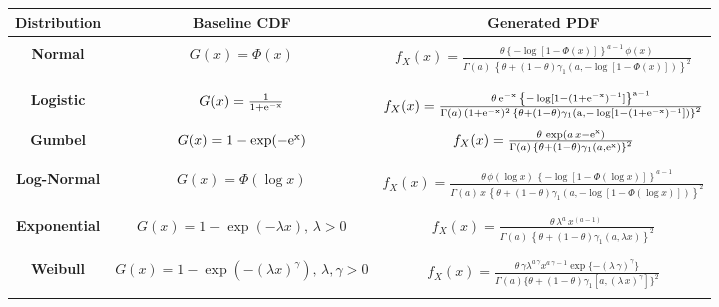 \documentclass[12pt,a4paper]{article} %
\begin{document}
\begin{landscape}
\begin{table}[htbp]\label{tabspecial1}
\centering
\begin{tabular}{c|c|c}
\hline
\textbf{Distribution} & \textbf{Baseline CDF} & \textbf{Generated PDF}  \\
\hline
{} & {} & {} \\
\textbf{Normal} &  $G(x)=\Phi(x)$ & $f_{X}(x)=\frac{\theta  \left\{ -\log[1-\Phi(x)] \right\}^{a-1}\, \phi(x)}{\Gamma(a)\,\left\{\theta+(1-\theta)\gamma_1\left( a, -\log \left[1-\Phi(x)\right]\right)\right\}^{2}}$ \\
{} & {} & {} \\
\hline
{} & {} & {} \\
\textbf{Logistic} &  $G(x)=\frac{1}{1+\rm{e}^{-x}}$ & $f_{X}(x)=\frac{\theta\,\rm{e}^{-x}\, \left\{ -\log[1-(1+\rm{e}^{-x})^{-1}] \right\}^{a-1}}{\Gamma(a)\,(1+\rm{e}^{-x})^{2}\,\left\{\theta+(1-\theta)\gamma_1\left( a, -\log \left[1-(1+\rm{e}^{-x})^{-1}\right]\right)\right\}^{2}}$\\
{} & {} & {} \\
\hline
\textbf{Gumbel} &  $G(x)=1-\exp(-\rm{e}^x)$ & $f_{X}(x)=\frac{\theta \, \exp(a \,x-  \rm{e}^x)}{\Gamma(a)\,\left\{\theta+(1-\theta)\gamma_1\left(a, \rm{e}^{x}\right)\right\}^{2}}$ \\
{} & {} & {} \\
\hline
{} & {} & {} \\
\textbf{Log-Normal} &  $G(x)=\Phi(\log x)$ & $f_{X}(x)=\frac{\theta\,\phi(\log x)\,  \left\{ -\log[1-\Phi(\log x)] \right\}^{a-1}}{\Gamma(a)\,x\,\left\{\theta+(1-\theta)\gamma_1\left( a, -\log \left[1-\Phi(\log x)\right]\right)\right\}^{2}}$ \\
{} & {} & {} \\
\hline
{} & {} & {} \\
\textbf{Exponential} &  $G(x)=1-\exp(-\lambda x),\,\lambda>0$ & $f_{X}(x)=\frac{\theta\,\lambda^{a}\,x^{(a-1)}\, }{\Gamma(a)\,\left\{\theta+(1-\theta)\gamma_1\left(a,\lambda x\right)\right\}^{2}}$ \\
{} & {} & {} \\
\hline
{} & {} & {} \\
\textbf{Weibull} &  $G(x)=1-\exp(-(\lambda x)^\gamma),\,\lambda,\gamma>0$ & $f_X(x)=\frac{\theta\,\gamma\lambda^{a\,\gamma}x^{a\,\gamma-1}\exp\{-(\lambda\,\gamma)^\gamma\}}{\Gamma (a)\{\theta+(1-\theta)\gamma_1[a,(\lambda\,x)^\gamma]\}^2}$ \\
{} & {} & {} \\

\end{tabular}
\end{table}
\end{landscape}
\end{document}
